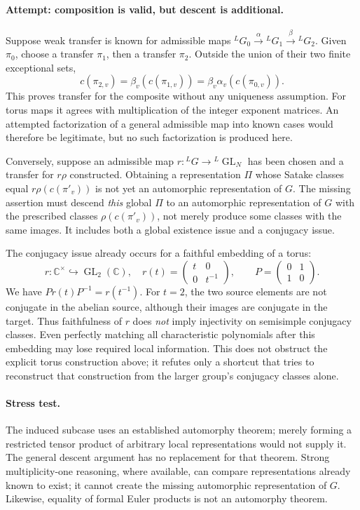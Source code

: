 \documentclass[11pt,a4paper]{article}
\newcommand{\C}{\mathbb{C}}
\begin{document}
\paragraph{Attempt: composition is valid, but descent is additional.}
Suppose weak transfer is known for admissible maps
${}^LG_0\xrightarrow{\alpha}{}^LG_1\xrightarrow{\beta}{}^LG_2$.
Given $\pi_0$, choose a transfer $\pi_1$, then a transfer $\pi_2$.
Outside the union of their two finite exceptional sets,
\[
 c(\pi_{2,v})=\beta_v(c(\pi_{1,v}))
             =\beta_v\alpha_v(c(\pi_{0,v})).
 \tag{7.4}
\]
This proves transfer for the composite without any uniqueness assumption.
For torus maps it agrees with multiplication of the integer exponent
matrices. An attempted factorization of a general admissible map into
known cases would therefore be legitimate, but no such factorization is
produced here.

Conversely, suppose an admissible map
$r:{}^LG\to{}^L\operatorname{GL}_N$ has been chosen and a transfer for
$r\rho$ constructed. Obtaining a representation $\Pi$ whose Satake
classes equal $r\rho(c(\pi'_v))$ is not yet an automorphic representation
of $G$. The missing assertion must descend \emph{this} global $\Pi$ to
an automorphic representation of $G$ with the prescribed classes
$\rho(c(\pi'_v))$, not merely produce some classes with the same images.
It includes both a global existence issue and a conjugacy issue.

The conjugacy issue already occurs for a faithful embedding of a torus:
\[
 r:\C^\times\hookrightarrow\operatorname{GL}_2(\C),\quad
 r(t)=\begin{pmatrix}t&0\\0&t^{-1}\end{pmatrix},\qquad
 P=\begin{pmatrix}0&1\\1&0\end{pmatrix}.
 \tag{7.5}
\]
We have $Pr(t)P^{-1}=r(t^{-1})$. For $t=2$, the two source elements are
not conjugate in the abelian source, although their images are conjugate
in the target. Thus faithfulness of $r$ does \emph{not} imply injectivity
on semisimple conjugacy classes. Even perfectly matching all characteristic
polynomials after this embedding may lose required local information.
This does not obstruct the explicit torus construction above; it refutes
only a shortcut that tries to reconstruct that construction from the
larger group's conjugacy classes alone.

\paragraph{Stress test.}
The induced subcase uses an established automorphy theorem; merely
forming a restricted tensor product of arbitrary local representations
would not supply it. The general descent argument has no replacement
for that theorem. Strong multiplicity-one reasoning, where available,
can compare representations already known to exist; it cannot create
the missing automorphic representation of $G$. Likewise, equality of
formal Euler products is not an automorphy theorem.
\end{document}
